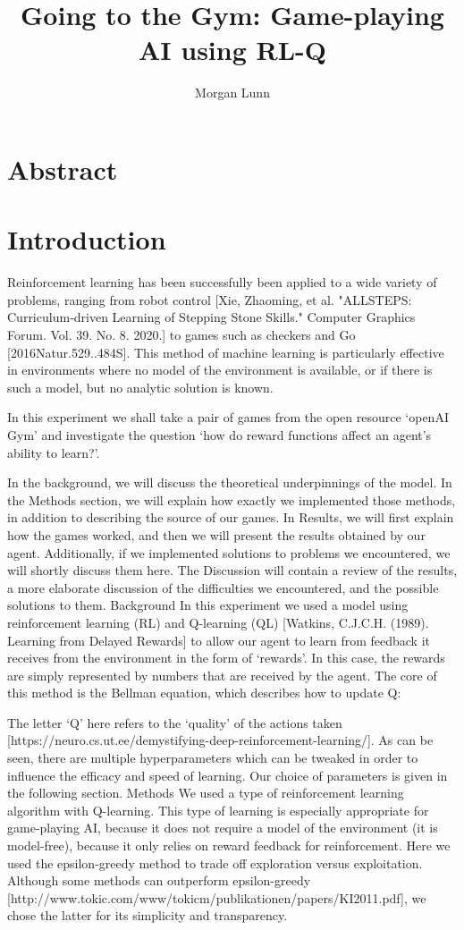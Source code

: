 \documentclass[a4paper]{article}
\title{Going to the Gym: Game-playing AI using RL-Q}
\author{Morgan Lunn}
\date{}
\begin{document}
	\maketitle

	\section{Abstract}%
	\label{sec:Abstract}
	\section{Introduction}%
	\label{sec:Introduction}
Reinforcement learning has been successfully been applied to a wide variety of problems, ranging from robot control [Xie, Zhaoming, et al. "ALLSTEPS: Curriculum‐driven Learning of Stepping Stone Skills." Computer Graphics Forum. Vol. 39. No. 8. 2020.] to games such as checkers and Go [2016Natur.529..484S]. This method of machine learning is particularly effective in environments where no model of the environment is available, or if there is such a model, but no analytic solution is known.

In this experiment we shall take a pair of games from the open resource `openAI Gym’ and investigate the question `how do reward functions affect an agent’s ability to learn?’.

In the background, we will discuss the theoretical underpinnings of the model. In the Methods section, we will explain how exactly we implemented those methods, in addition to describing the source of our games. In Results, we will first explain how the games worked, and then we will present the results obtained by our agent. Additionally, if we implemented solutions to problems we encountered, we will shortly discuss them here. The Discussion will contain a review of the results, a more elaborate discussion of the difficulties we encountered, and the possible solutions to them.
Background
In this experiment we used a model using reinforcement learning (RL) and Q-learning (QL) [Watkins, C.J.C.H. (1989). Learning from Delayed Rewards] to allow our agent to learn from feedback it receives from the environment in the form of ‘rewards’. In this case, the rewards are simply represented by numbers that are received by the agent. The core of this method is the Bellman equation, which describes how to update Q:

The letter ‘Q’ here refers to the ‘quality’ of the actions taken [https://neuro.cs.ut.ee/demystifying-deep-reinforcement-learning/]. As can be seen, there are multiple hyperparameters which can be tweaked in order to influence the efficacy and speed of learning. Our choice of parameters is given in the following section.
Methods
We used a type of reinforcement learning algorithm with Q-learning. This type of learning is especially appropriate for game-playing AI, because it does not require a model of the environment (it is model-free), because it only relies on reward feedback for reinforcement. Here we used the epsilon-greedy method to trade off exploration versus exploitation. Although some methods can outperform epsilon-greedy [http://www.tokic.com/www/tokicm/publikationen/papers/KI2011.pdf], we chose the latter for its simplicity and transparency.
\end{document}
